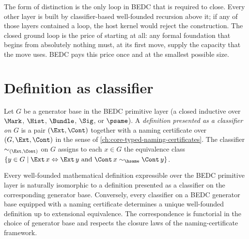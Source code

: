 \begin{remark}
\label{rem:ground-loop-must-close}
The form of distinction is the only loop in BEDC that is required to close. Every other layer is built by classifier-based well-founded recursion above it; if any of those layers contained a loop, the host kernel would reject the construction. The closed ground loop is the price of starting at all: any formal foundation that begins from absolutely nothing must, at its first move, supply the capacity that the move uses. BEDC pays this price once and at the smallest possible size.
\end{remark}

\section{Definition as classifier}
\label{sec:reflection-def-as-classifier}

\begin{definition}
\label{def:definition-as-classifier}
Let $G$ be a generator base in the BEDC primitive layer (a closed inductive over $\Mark$, $\Hist$, $\Bundle$, $\Sig$, or $\psame$). A \emph{definition presented as a classifier on $G$} is a pair $(\Ext, \Cont)$ together with a naming certificate over $(G, \Ext, \Cont)$ in the sense of \autoref{ch:core-typed-naming-certificates}. The classifier $\sim_{(\Ext, \Cont)}$ on $G$ assigns to each $x \in G$ the equivalence class $\{ y \in G \mid \Ext\,x \Leftrightarrow \Ext\,y \text{ and } \Cont\,x \sim_{\hsame} \Cont\,y \}$.
\end{definition}

\begin{theorem}
\label{thm:definition-classifier-correspondence}
Every well-founded mathematical definition expressible over the BEDC primitive layer is naturally isomorphic to a definition presented as a classifier on the corresponding generator base. Conversely, every classifier on a BEDC generator base equipped with a naming certificate determines a unique well-founded definition up to extensional equivalence. The correspondence is functorial in the choice of generator base and respects the closure laws of the naming-certificate framework.
\end{theorem}

